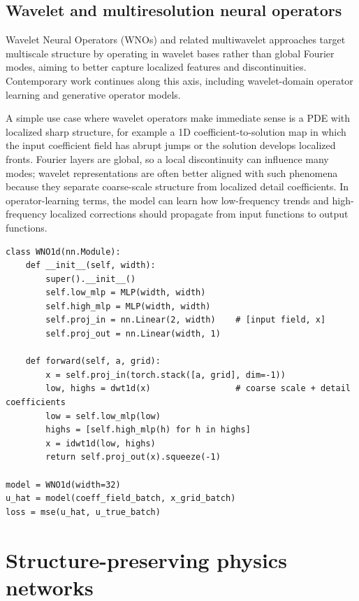 \documentclass[11pt]{article}
\begin{document}
\subsection{Wavelet and multiresolution neural operators}

Wavelet Neural Operators (WNOs) and related multiwavelet approaches target multiscale structure by operating in wavelet bases rather than global Fourier modes, aiming to better capture localized features and discontinuities. Contemporary work continues along this axis, including wavelet-domain operator learning and generative operator models.

A simple use case where wavelet operators make immediate sense is a PDE with localized sharp structure, for example a 1D coefficient-to-solution map in which the input coefficient field has abrupt jumps or the solution develops localized fronts. Fourier layers are global, so a local discontinuity can influence many modes; wavelet representations are often better aligned with such phenomena because they separate coarse-scale structure from localized detail coefficients. In operator-learning terms, the model can learn how low-frequency trends and high-frequency localized corrections should propagate from input functions to output functions.

\begin{lstlisting}[style=scimlpython,caption={Representative wavelet neural operator sketch for localized multiscale signals.},label={lst:wno}]
class WNO1d(nn.Module):
    def __init__(self, width):
        super().__init__()
        self.low_mlp = MLP(width, width)
        self.high_mlp = MLP(width, width)
        self.proj_in = nn.Linear(2, width)    # [input field, x]
        self.proj_out = nn.Linear(width, 1)

    def forward(self, a, grid):
        x = self.proj_in(torch.stack([a, grid], dim=-1))
        low, highs = dwt1d(x)                 # coarse scale + detail coefficients
        low = self.low_mlp(low)
        highs = [self.high_mlp(h) for h in highs]
        x = idwt1d(low, highs)
        return self.proj_out(x).squeeze(-1)

model = WNO1d(width=32)
u_hat = model(coeff_field_batch, x_grid_batch)
loss = mse(u_hat, u_true_batch)
\end{lstlisting}

\section{Structure-preserving physics networks}
\end{document}
